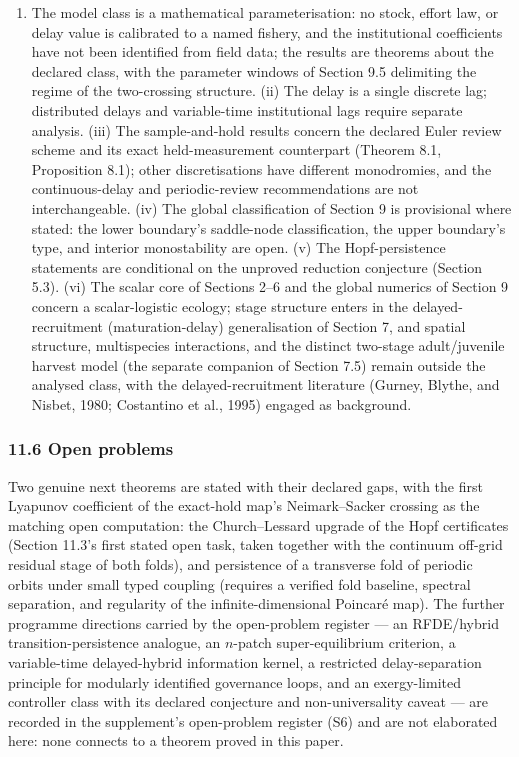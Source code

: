 \documentclass[11pt]{article}
\providecommand{\tightlist}{\setlength{\itemsep}{0pt}\setlength{\parskip}{0pt}}
\begin{document}
\begin{enumerate}
\def\labelenumi{(\roman{enumi})}
\tightlist
\item
  The model class is a mathematical parameterisation: no stock, effort
  law, or delay value is calibrated to a named fishery, and the
  institutional coefficients have not been identified from field data;
  the results are theorems about the declared class, with the parameter
  windows of Section 9.5 delimiting the regime of the two-crossing
  structure. (ii) The delay is a single discrete lag; distributed delays
  and variable-time institutional lags require separate analysis. (iii)
  The sample-and-hold results concern the declared Euler review scheme
  and its exact held-measurement counterpart (Theorem 8.1, Proposition
  8.1); other discretisations have different monodromies, and the
  continuous-delay and periodic-review recommendations are not
  interchangeable. (iv) The global classification of Section 9 is
  provisional where stated: the lower boundary's saddle-node
  classification, the upper boundary's type, and interior monostability
  are open. (v) The Hopf-persistence statements are conditional on the
  unproved reduction conjecture (Section 5.3). (vi) The scalar core of
  Sections 2--6 and the global numerics of Section 9 concern a
  scalar-logistic ecology; stage structure enters in the
  delayed-recruitment (maturation-delay) generalisation of Section 7,
  and spatial structure, multispecies interactions, and the distinct
  two-stage adult/juvenile harvest model (the separate companion of
  Section 7.5) remain outside the analysed class, with the
  delayed-recruitment literature (Gurney, Blythe, and Nisbet, 1980;
  Costantino et al., 1995) engaged as background.
\end{enumerate}

\subsubsection{11.6 Open problems}\label{open-problems}

Two genuine next theorems are stated with their declared gaps, with the
first Lyapunov coefficient of the exact-hold map's Neimark--Sacker
crossing as the matching open computation: the Church--Lessard upgrade
of the Hopf certificates (Section 11.3's first stated open task, taken
together with the continuum off-grid residual stage of both folds), and
persistence of a transverse fold of periodic orbits under small typed
coupling (requires a verified fold baseline, spectral separation, and
regularity of the infinite-dimensional Poincar\'e map). The further
programme directions carried by the open-problem register --- an
RFDE/hybrid transition-persistence analogue, an \(n\)-patch
super-equilibrium criterion, a variable-time delayed-hybrid information
kernel, a restricted delay-separation principle for modularly identified
governance loops, and an exergy-limited controller class with its
declared conjecture and non-universality caveat --- are recorded in the
supplement's open-problem register (S6) and are not elaborated here:
none connects to a theorem proved in this paper.
\end{document}
